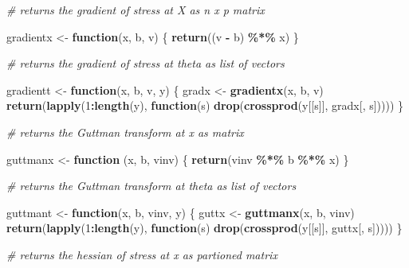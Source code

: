 \documentclass[
  12pt,
]{article}
\newenvironment{Shaded}{\begin{snugshade}}{\end{snugshade}}
\newcommand{\CommentTok}[1]{\textcolor[rgb]{0.56,0.35,0.01}{\textit{#1}}}
\newcommand{\ControlFlowTok}[1]{\textcolor[rgb]{0.13,0.29,0.53}{\textbf{#1}}}
\newcommand{\DecValTok}[1]{\textcolor[rgb]{0.00,0.00,0.81}{#1}}
\newcommand{\FunctionTok}[1]{\textcolor[rgb]{0.13,0.29,0.53}{\textbf{#1}}}
\newcommand{\NormalTok}[1]{#1}
\newcommand{\OtherTok}[1]{\textcolor[rgb]{0.56,0.35,0.01}{#1}}
\newcommand{\SpecialCharTok}[1]{\textcolor[rgb]{0.81,0.36,0.00}{\textbf{#1}}}
\begin{document}
\begin{Shaded}
\begin{Highlighting}[]
\CommentTok{\# returns the gradient of stress at X as n x p matrix}

\NormalTok{gradientx }\OtherTok{\textless{}{-}} \ControlFlowTok{function}\NormalTok{(x, b, v) \{}
  \FunctionTok{return}\NormalTok{((v }\SpecialCharTok{{-}}\NormalTok{ b) }\SpecialCharTok{\%*\%}\NormalTok{ x)}
\NormalTok{\}}

\CommentTok{\# returns the gradient of stress at theta as list of vectors}

\NormalTok{gradientt }\OtherTok{\textless{}{-}} \ControlFlowTok{function}\NormalTok{(x, b, v, y) \{}
\NormalTok{  gradx }\OtherTok{\textless{}{-}} \FunctionTok{gradientx}\NormalTok{(x, b, v)}
  \FunctionTok{return}\NormalTok{(}\FunctionTok{lapply}\NormalTok{(}\DecValTok{1}\SpecialCharTok{:}\FunctionTok{length}\NormalTok{(y), }\ControlFlowTok{function}\NormalTok{(s) }\FunctionTok{drop}\NormalTok{(}\FunctionTok{crossprod}\NormalTok{(y[[s]], gradx[, s]))))}
\NormalTok{\}}

\CommentTok{\# returns the Guttman transform at x as matrix}

\NormalTok{guttmanx }\OtherTok{\textless{}{-}} \ControlFlowTok{function}\NormalTok{ (x, b, vinv) \{}
  \FunctionTok{return}\NormalTok{(vinv }\SpecialCharTok{\%*\%}\NormalTok{ b }\SpecialCharTok{\%*\%}\NormalTok{ x)}
\NormalTok{\}}

\CommentTok{\# returns the Guttman transform at theta as list of vectors}

\NormalTok{guttmant }\OtherTok{\textless{}{-}} \ControlFlowTok{function}\NormalTok{(x, b, vinv, y) \{}
\NormalTok{  guttx }\OtherTok{\textless{}{-}} \FunctionTok{guttmanx}\NormalTok{(x, b, vinv)}
  \FunctionTok{return}\NormalTok{(}\FunctionTok{lapply}\NormalTok{(}\DecValTok{1}\SpecialCharTok{:}\FunctionTok{length}\NormalTok{(y), }\ControlFlowTok{function}\NormalTok{(s) }\FunctionTok{drop}\NormalTok{(}\FunctionTok{crossprod}\NormalTok{(y[[s]], guttx[, s]))))}
\NormalTok{\}}

\CommentTok{\# returns the hessian of stress at x as partioned matrix}


\end{Highlighting}
\end{Shaded}
\end{document}
